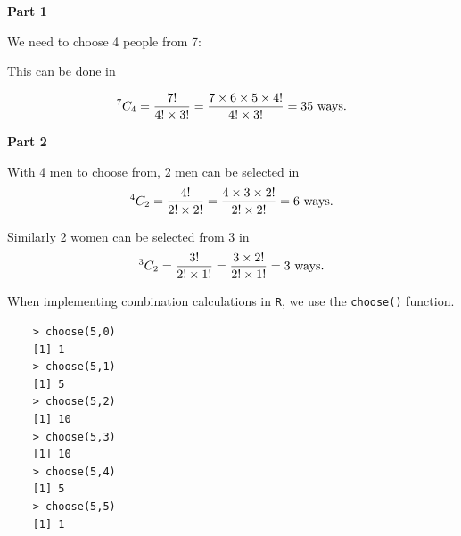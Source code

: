 \documentclass[12pt]{report}
\begin{document}
{\Large
	
	\textbf{Part 1}
	
	We need to choose 4 people from 7:
	
	This can be done in
	
	\[
	^7 C_4  = {7!  \over 4! \times 3!} =  {7 \times 6 \times 5 \times 4!  \over 4! \times 3!} = 35 \mbox{ ways.}
	\]
	
	
	\textbf{Part 2}
	
	With 4 men to choose from, 2 men can be selected in \[
	^4 C_2  = {4!  \over 2! \times 2!} =  {4 \times 3 \times 2!  \over 2! \times 2!} = 6\mbox{ ways.}
	\]
	
	Similarly 2 women can be selected from 3 in
	\[
	^3 C_2  = {3!  \over 2! \times1!} =  {3 \times 2!  \over 2! \times 1!} = 3\mbox{ ways.}
	\]
	
}

When implementing combination calculations in \texttt{R}, we use the \texttt{choose()} function.
\begin{framed}	
	\begin{verbatim}
	> choose(5,0)
	[1] 1
	> choose(5,1)
	[1] 5
	> choose(5,2)
	[1] 10
	> choose(5,3)
	[1] 10
	> choose(5,4)
	[1] 5
	> choose(5,5)
	[1] 1
	\end{verbatim}
\end{framed}
	
\end{document}
